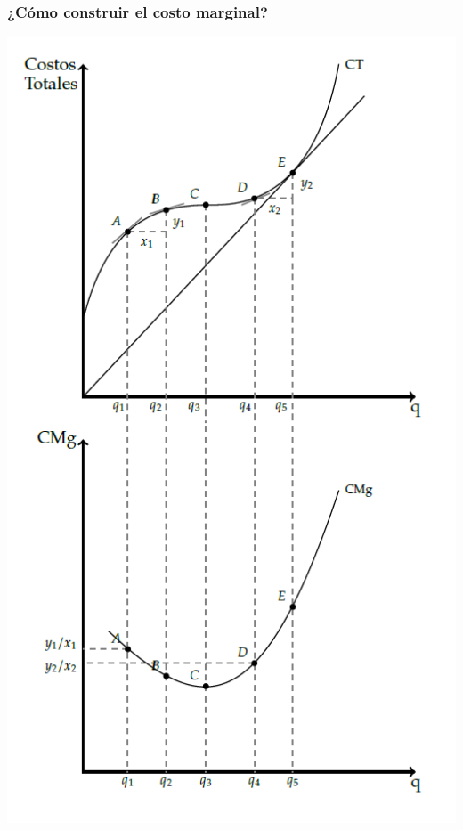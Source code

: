 \documentclass{beamer}
\begin{document}
\begin{frame}
\frametitle{¿Cómo construir el costo marginal?}
\centering
\includegraphics[scale=0.9]{Slides Principios de Economia/Figures/Contruyendocmg.png}
\end{frame}
\end{document}
